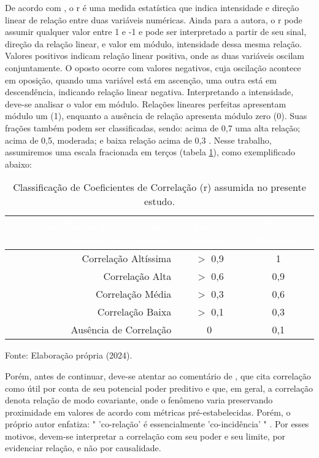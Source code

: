 \documentclass[
	12pt,				%
	openright,			%
	oneside,			%
	a4paper,			%
	english,			%
	french,				%
	spanish,			%
	brazil				%
	dvipsnames, table]{abntex2}
\begin{document}
\indent De acordo com , o \acrfull{r} é uma medida estatística que indica intensidade e direção linear de relação entre duas variáveis numéricas. Ainda para a autora, o \acrlong{r} pode assumir qualquer valor entre 1 e -1 e pode ser interpretado a partir de seu sinal, direção da relação linear, e valor em módulo, intensidade dessa mesma relação.
Valores positivos indicam relação linear positiva, onde as duas variáveis oscilam conjuntamente. O oposto ocorre com valores negativos, cuja oscilação acontece em oposição, quando uma variável está em ascenção, uma outra está em descendência, indicando relação linear negativa. Interpretando a intensidade, deve-se analisar o valor em módulo. Relações lineares perfeitas apresentam módulo um (1), enquanto a ausência de relação apresenta módulo zero (0). Suas frações também podem ser classificadas, sendo: acima de 0,7 uma alta relação; acima de 0,5, moderada; e baixa relação acima de 0,3 \cite{StatsDummies}. Nesse trabalho, assumiremos uma escala fracionada em terços (tabela \ref{tab:class_corr}), como exemplificado abaixo:

\begin{table}[htbp]
    \begin{center}
    \caption{Classificação de Coeficientes de Correlação (r) assumida no presente estudo.}
    {
    \begin{tabular}{r|cc}
    \hline
    \toprule
    \rowcolor{darkgray} \textcolor{white}{Classificação de Intensidade (Valores em Módulo)} & \textcolor{white}{Limite Inferior} & \textcolor{white}{Limite Superior}\\
    \midrule
    Correlação Altíssima & $>$ 0,9 & 1\\
    Correlação Alta & $>$  0,6 & 0,9\\
    Correlação Média & $>$  0,3 & 0,6\\
    Correlação Baixa & $>$  0,1 & 0,3\\
    Ausência de Correlação & 0 & 0,1\\
    \bottomrule
    \end{tabular}}
    \label{tab:class_corr}
    \end{center}
    \small{Fonte: Elaboração própria (2024).}
\end{table}

\indent Porém, antes de continuar, deve-se atentar ao comentário de , que cita correlação como útil por conta de seu potencial poder preditivo e que, em geral, a correlação denota relação de modo covariante, onde o fenômeno varia preservando proximidade em valores de acordo com métricas pré-estabelecidas. Porém, o próprio autor enfatiza: " 'co-relação' é essencialmente 'co-incidência' " \cite{espurioCorr}. Por esses motivos, devem-se interpretar a correlação com seu poder e seu limite, por evidenciar relação, e não por causalidade.
\end{document}
